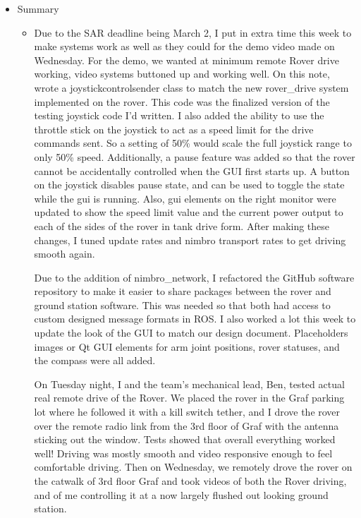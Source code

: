 \begin{itemize}
\begin{itemize}
    \item Summary
      \begin{itemize}
      \item Due to the SAR deadline being March 2, I put in extra time this week to make systems work as well as they could for the demo video made on Wednesday. For the demo, we wanted at minimum remote Rover drive working, video systems buttoned up and working well. On this note, wrote a joystickcontrolsender class to match the new rover\_drive system implemented on the rover. This code was the finalized version of the testing joystick code I'd written. I also added the ability to use the throttle stick on the joystick to act as a speed limit for the drive commands sent. So a setting of 50\% would scale the full joystick range to only 50\% speed. Additionally, a pause feature was added so that the rover cannot be accidentally controlled when the GUI first starts up. A button on the joystick disables pause state, and can be used to toggle the state while the gui is running. Also, gui elements on the right monitor were updated to show the speed limit value and the current power output to each of the sides of the rover in tank drive form. After making these changes, I tuned update rates and nimbro transport rates to get driving smooth again.  

Due to the addition of nimbro\_network, I refactored the GitHub software repository to make it easier to share packages between the rover and ground station software. This was needed so that both had access to custom designed message formats in ROS. I also worked a lot this week to update the look of the GUI to match our design document. Placeholders images or Qt GUI elements for arm joint positions, rover statuses, and the compass were all added.  

On Tuesday night, I and the team's mechanical lead, Ben, tested actual real remote drive of the Rover. We placed the rover in the Graf parking lot where he followed it with a kill switch tether, and I drove the rover over the remote radio link from the 3rd floor of Graf with the antenna sticking out the window. Tests showed that overall everything worked well! Driving was mostly smooth and video responsive enough to feel comfortable driving. Then on Wednesday, we remotely drove the rover on the catwalk of 3rd floor Graf and took videos of both the Rover driving, and of me controlling it at a now largely flushed out looking ground station. 
      \end{itemize}
	\end{itemize}


\end{itemize}
